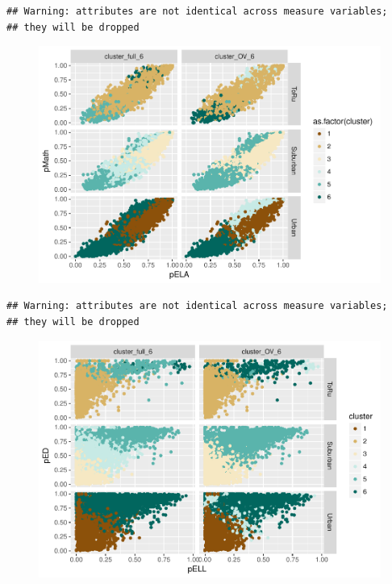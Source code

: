 \documentclass[floatsintext,man]{apa6}
\theoremstyle{definition}
\theoremstyle{definition}
\theoremstyle{definition}
\theoremstyle{remark}
\begin{document}
\begin{verbatim}
## Warning: attributes are not identical across measure variables;
## they will be dropped
\end{verbatim}

\begin{figure}
\centering
\includegraphics{Method_files/figure-latex/unnamed-chunk-2-1.pdf}
\caption{}
\end{figure}

\begin{verbatim}
## Warning: attributes are not identical across measure variables;
## they will be dropped
\end{verbatim}

\begin{figure}
\centering
\includegraphics{Method_files/figure-latex/unnamed-chunk-3-1.pdf}
\caption{}
\end{figure}
\end{document}

